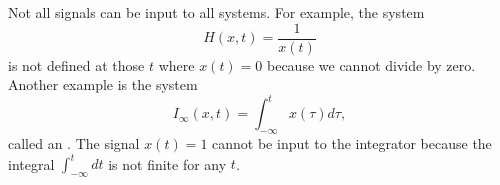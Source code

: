 \begin{test}


\end{test}



Not all signals can be input to all systems.  For example, the system
\[
H(x,t) = \frac{1}{x(t)}
\]
is not defined at those $t$ where $x(t) = 0$ because we cannot divide by zero.  Another example is the system
\begin{equation}\label{eq:deifferentiator}
I_{\infty}(x,t) = \int_{-\infty}^{t} x(\tau) d\tau ,
\end{equation}
called an .  %
The signal $x(t) = 1$ cannot be input to the integrator because the integral $\int_{-\infty}^{t} dt$ is not finite for any $t$.  %

